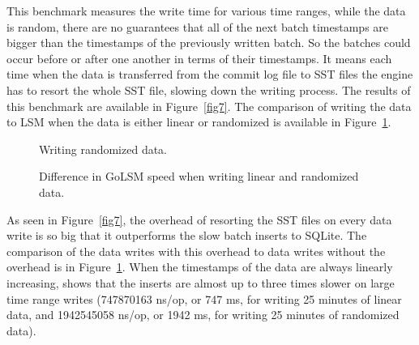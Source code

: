 This benchmark measures the write time for various time ranges, while the data is random, there are no guarantees that all of the next batch timestamps are bigger than the timestamps of the previously written batch. So the batches could occur before or after one another in terms of their timestamps. It means each time when the data is transferred from the commit log file to SST files the engine has to resort the whole SST file, slowing down the writing process. The results of this benchmark are available in Figure~\ref{fig7}. The comparison of writing the data to LSM when the data is either linear or randomized is available in Figure~\ref{fig8}.

\begin{figure}[!htb]
	\begin{minipage}{0.48\textwidth}
		\centering
		\resizebox{\textwidth}{!}{%
			
		}
		\caption{Writing randomized data.}\label{fig7}
	\end{minipage}\hfill
	\begin{minipage}{0.48\textwidth}
		\centering
		\resizebox{\textwidth}{!}{%
			
		}
		\caption{Difference in GoLSM speed when writing linear and randomized data.}\label{fig8}
	\end{minipage}
\end{figure}

As seen in Figure~\ref{fig7}, the overhead of resorting the SST files on every data write is so big that it outperforms the slow batch inserts to SQLite. The comparison of the data writes with this overhead to data writes without the overhead is in Figure~\ref{fig8}. When the timestamps of the data are always linearly increasing, shows that the inserts are almost up to three times slower on large time range writes (747870163 ns/op, or 747 ms, for writing 25 minutes of linear data, and 1942545058 ns/op, or 1942 ms, for writing 25 minutes of randomized data).